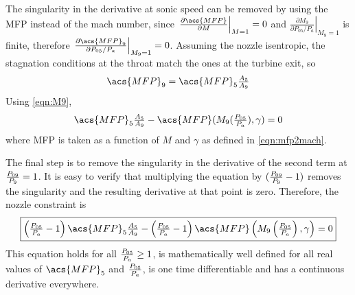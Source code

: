 \documentclass[tcc]{subfiles}
\begin{document}
The singularity in the derivative at sonic speed can be removed by using the \ac{MFP} instead of the mach number, since 
$\left.\frac{\partial\acs{MFP}}{\partial M} \right|_{M=1} = 0$ 
and 
$\left.\frac{\partial M_9}{\partial P_{05}/P_a}\right|_{M_9=1}$ is finite, 
therefore $\left.\frac{\partial\acs{MFP}_9}{\partial P_{05}/P_a}\right|_{M_9=1}=0$.
 Assuming the nozzle isentropic, the stagnation conditions at the throat match the ones at the turbine exit, so
\begin{equation}
    \acs{MFP}_9 = \acs{MFP}_5 \tfrac{A_5}{A_9}
\end{equation}
Using \cref{eqn:M9},
\begin{equation}
    \textstyle
    \acs{MFP}_5 \tfrac{A_5}{A_9} - \acs{MFP}(M_9(\pr{05}{a}), \gamma) = 0
\end{equation}
where \acs{MFP} is taken as a function of $M$ and $\gamma$ as defined in \cref{eqn:mfp2mach}.

The final step is to remove the singularity in the derivative of the second term at $\frac{P_{09}}{P_{9}} = 1$. 
It is easy to verify that multiplying the equation by $(\frac{P_{09}}{P_{9}}-1)$ removes the singularity and the resulting derivative at that point is zero. 
Therefore, the nozzle constraint is
\begin{equation}
    \label{eqn:nozzle}
    \boxed{
    \textstyle
        \left(\pr{05}{a}-1\right)\acs{MFP}_5\frac{A_5}{A_9} - \left(\pr{05}{a}-1\right)\acs{MFP}\left(M_9\left(\pr{05}{a}\right), \gamma\right) = 0
    }
\end{equation}
This equation holds for all $\frac{P_{05}}{P_{a}} \geq 1$, is mathematically well defined for all real values of $\acs{MFP}_5$ and $\frac{P_{05}}{P_{a}}$, is one time differentiable and has a continuous derivative everywhere.
\end{document}
